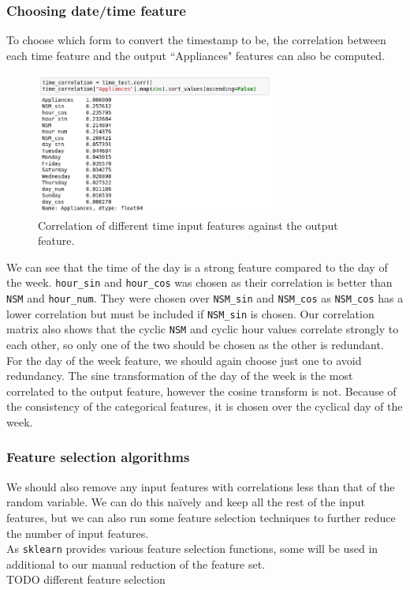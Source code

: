 \documentclass{article}
\newcommand{\n}[0]{\\[\baselineskip]}
\begin{document}
\subsubsection{Choosing date/time feature}
To choose which form to convert the timestamp to be, the correlation between each time feature and the output ``Appliances" features can also be computed. 
\begin{figure}[H]
\centering
\includegraphics[width=0.7\textwidth, keepaspectratio]{imgs/time-correlation.png}
\caption{Correlation of different time input features against the output feature.}
\end{figure}
\noindent
We can see that the time of the day is a strong feature compared to the day of the week.  \texttt{hour\_sin} and \texttt{hour\_cos} was chosen as their correlation is better than \texttt{NSM} and \texttt{hour\_num}. They were chosen over \texttt{NSM\_sin} and \texttt{NSM\_cos} as \texttt{NSM\_cos} has a lower correlation but must be included if \texttt{NSM\_sin} is chosen. Our correlation matrix also shows that the cyclic \texttt{NSM} and cyclic hour values correlate strongly to each other, so only one of the two should be chosen as the other is redundant. 
\n
For the day of the week feature, we should again choose just one to avoid redundancy. The sine transformation of the day of the week is the most correlated to the output feature, however the cosine transform is not. Because of the consistency of the categorical features, it is chosen over the cyclical day of the week. 

\subsubsection{Feature selection algorithms}
We should also remove any input features with correlations less than that of the random variable. We can do this na\"{i}vely and keep all the rest of the input features, but we can also run some feature selection techniques to further reduce the number of input features.
\n
As \texttt{sklearn} provides various feature selection functions, some will be used in additional to our manual reduction of the feature set. 
\n
TODO different feature selection
\end{document}

